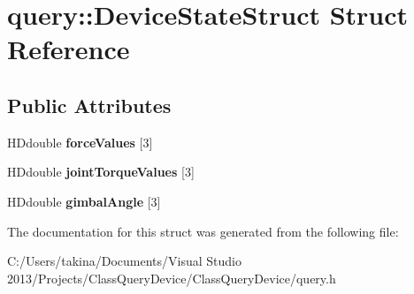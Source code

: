 \hypertarget{structquery_1_1_device_state_struct}{}\section{query\+:\+:Device\+State\+Struct Struct Reference}
\label{structquery_1_1_device_state_struct}
\subsection*{Public Attributes}
\begin{DoxyCompactItemize}
\item 
\hypertarget{structquery_1_1_device_state_struct_a366252dd48084021559412551cb16e51}{}\label{structquery_1_1_device_state_struct_a366252dd48084021559412551cb16e51} 
H\+Ddouble {\bfseries force\+Values} \mbox{[}3\mbox{]}
\item 
\hypertarget{structquery_1_1_device_state_struct_a1a4a326ae5d6f04047c99deed8901cfd}{}\label{structquery_1_1_device_state_struct_a1a4a326ae5d6f04047c99deed8901cfd} 
H\+Ddouble {\bfseries joint\+Torque\+Values} \mbox{[}3\mbox{]}
\item 
\hypertarget{structquery_1_1_device_state_struct_afe4e105954bc88985d261fc429f2de8b}{}\label{structquery_1_1_device_state_struct_afe4e105954bc88985d261fc429f2de8b} 
H\+Ddouble {\bfseries gimbal\+Angle} \mbox{[}3\mbox{]}
\end{DoxyCompactItemize}


The documentation for this struct was generated from the following file\+:\begin{DoxyCompactItemize}
\item 
C\+:/\+Users/takina/\+Documents/\+Visual Studio 2013/\+Projects/\+Class\+Query\+Device/\+Class\+Query\+Device/query.\+h\end{DoxyCompactItemize}
